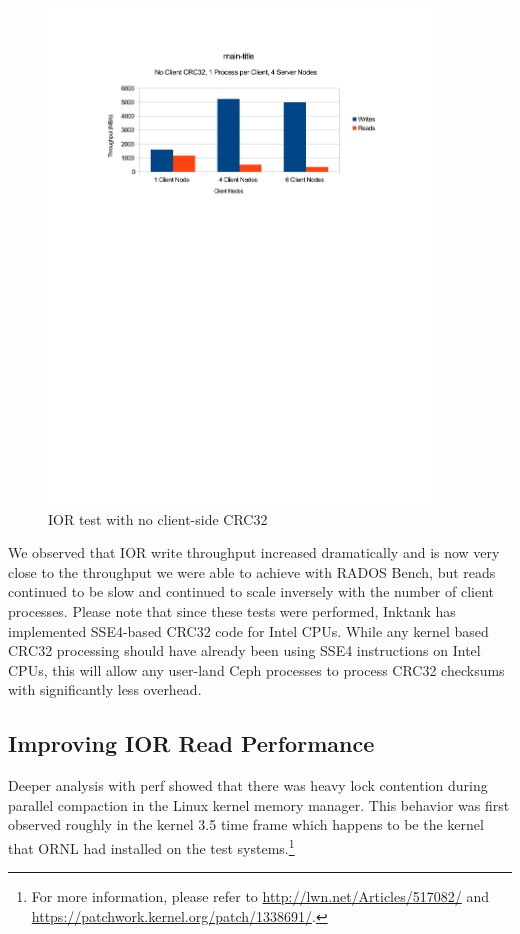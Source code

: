\documentclass{article}
\begin{document}
\begin{figure}[htb]
\centering
\includegraphics[width=4in]{ior-client-no-crc32}
\caption{IOR test with no client-side CRC32}
\label{fig:ior-no-client-crc32}
\end{figure}

We observed that IOR write throughput increased dramatically and is now very
close to the throughput we were able to achieve with RADOS Bench, but reads
continued to be slow and continued to scale inversely with the number of client
processes.  Please note that since these tests were performed, Inktank has
implemented SSE4-based CRC32 code for Intel CPUs.  While any kernel based CRC32
processing should have already been using SSE4 instructions on Intel CPUs, this
will allow any user-land Ceph processes to process CRC32 checksums with
significantly less overhead.

\subsection{Improving IOR Read Performance}

Deeper analysis with perf showed that there was heavy lock contention during
parallel compaction in the Linux kernel memory manager.  This behavior was first
observed roughly in the kernel 3.5 time frame which happens to be the kernel
that ORNL had installed on the test systems.\footnote{For more information,
please refer to \url{http://lwn.net/Articles/517082/} and
\url{https://patchwork.kernel.org/patch/1338691/}.}
\end{document}
